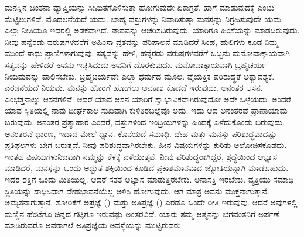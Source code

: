 ಮನಸ್ಸಿನ ಚಿಂತನಾ ವ್ಯಾಪ್ತಿಯನ್ನು ಸೀಮಿತಗೊಳಿಸುತ್ತಾ ಹೋಗುವುದೇ ಏಕಾಗ್ರತೆ. ಹಾಗೆ ಮಾಡುವುದಕ್ಕೆ ಎಂಟು ಮೆಟ್ಟಿಲುಗಳಿವೆ. ಮೊದಲನೆಯದೆ ಯಮ. ಬಾಹ್ಯ ವಸ್ತುಗಳನ್ನು ನಿವಾರಿಸುತ್ತಾ ಮನಸ್ಸನ್ನು ನಿಗ್ರಹಿಸುವುದೇ ಯಮ. ಎಲ್ಲಾ ನೀತಿಯೂ ಇದರಲ್ಲಿ ಅಡಕವಾಗಿದೆ. ಪಾಪವನ್ನು ಆಚರಿಸದಿರುವುದು. ಯಾರಿಗೂ ಹಿಂಸೆಯನ್ನು ಮಾಡದಿರುವುದು. ನೀವು ಹನ್ನೆರಡು ವರುಷಗಳವರೆಗೆ ಅಹಿಂಸಾ ವ್ರತವನ್ನು ಪರಿಪಾಲನೆ ಮಾಡಿದರೆ ಸಿಂಹ, ಹುಲಿಗಳು ಕೂಡ ನಿಮ್ಮ ಮುಂದೆ ಸಾಧು ಪ್ರಾಣಿಗಳಾಗುವುವು. ಸತ್ಯವನ್ನು ಹೇಳಿ, ಹನ್ನೆರಡು ವರುಷಗಳವರೆಗೆ ಒಬ್ಬನು ಮನೋವಾಕ್ಕಾಯವಾಗಿ ಸತ್ಯವನ್ನು ಹೇಳಿದರೆ ಅವನು ಇಚ್ಛಿಸಿದುದು ಅವನಿಗೆ ದೊರಕುವುದು. ಮನೋವಾಕ್ಕಾಯವಾಗಿ ಬ್ರಹ್ಮಚರ್ಯ ನಿಯಮವನ್ನು ಪಾಲಿಸಬೇಕು. ಬ್ರಹ್ಮಚರ್ಯವೇ ಎಲ್ಲಾ ಧರ್ಮದ ಮೂಲ. ವೈಯಕ್ತಿಕ ಪರಿಶುದ್ಧತೆ ಅತ್ಯಾವಶ್ಯಕ. ಎರಡನೆಯದೆ ನಿಯಮ. ಮನಸ್ಸು ಹೊರಗೆ ಹೋಗಲು ಅವಕಾಶ ಕೊಡದೆ ಇರುವುದು. ಅನಂತರ ಆಸನ. ಎಂಭತ್ತನಾಲ್ಕು ಆಸನಗಳಿವೆ. ಆದರೆ ಯಾವ ಆಸನ ಯಾರಿಗೆ ಸ್ವಾಭಾವಿಕವಾಗಿರುವುದೋ ಅದೇ ಒಳ್ಳೆಯದು. ಅಂದರೆ ಯಾವ ಸ್ಥಿತಿಯಲ್ಲಿ ನಾವು ದೀರ್ಘಕಾಲ ಸುಖವಾಗಿ ಕುಳಿತಿರಬಲ್ಲೆವೊ ಅದು. ಇದು ಆದ ಅನಂತರವೆ ಪ್ರಾಣಾಯಾಮ ಬರುವುದು. ಅನಂತರ ಪ್ರತ್ಯಾಹಾರ ಎಂದರೆ, ವಸ್ತುಗಳಿಂದ ಇಂದ್ರಿಯಗಳನ್ನು ಹಿಂದಕ್ಕೆ ಎಳೆದುಕೊಂಡು ಬರುವುದು. ಅನಂತರವೆ ಧಾರಣ, ಇದಾದ ಮೇಲೆ ಧ್ಯಾನ. ಕೊನೆಯದೆ ಸಮಾಧಿ. ದೇಹ ಮತ್ತು ಮನಸ್ಸು ಪರಿಶುದ್ಧವಾದಷ್ಟು ಪ್ರತಿಫಲಗಳು ಬೇಗ ಬರುತ್ತವೆ. ನೀವು ಪರಿಶುದ್ಧವಾಗಿರಬೇಕು. ಹೀನ ವಿಷಯಗಳನ್ನು ಕುರಿತು ಆಲೋಚಿಸಕೂಡದು. ಇಂತಹ ವಿಷಯಗಳು\break ನಿಜವಾಗಿ ನಮ್ಮನ್ನು ಕೆಳಕ್ಕೆ ಎಳೆಯುತ್ತವೆ. ನೀವು ಪರಿಶುದ್ಧರಾಗಿದ್ದರೆ, ಶ್ರದ್ಧೆಯಿಂದ ಅಭ್ಯಾಸ ಮಾಡಿದರೆ, ಮನಸ್ಸನ್ನು ಒಂದು ಅದ್ಭುತ ಶಕ್ತಿಯಿಂದ ಕೂಡಿದ ಪ್ರಕಾಶಮಾನವಾದ ಜ್ಯೋತಿಯನ್ನಾಗಿ ಮಾಡಬಹುದು. ಇದರ ಶಕ್ತಿಗೆ ಒಂದು ಮಿತಿಯಿಲ್ಲ. ಆದರೆ ಸತತ ಅಭ್ಯಾಸ ಮಾಡುತ್ತಿರಬೇಕು. ಅನಾಸಕ್ತಿ ಇರಬೇಕು. ವ್ಯಕ್ತಿಯು ಸಮಾಧಿ ಸ್ಥಿತಿಯನ್ನು ಸಾಧಿಸಿದಾಗ ದೇಹಭಾವನೆಯೆಲ್ಲ ಅಳಿಸಿ ಹೋಗುವುದು. ಆಗ ಮಾತ್ರ ಅವನು ಮುಕ್ತನಾಗುತ್ತಾನೆ. ಅಮೃತನಾಗುತ್ತಾನೆ. ತೋರಿಕೆಗೆ ಅಪ್ರಜ್ಞೆ () ಮತ್ತು ಅತಿಪ್ರಜ್ಞೆ () ಎರಡೂ ಒಂದೇ ರೀತಿ ಇರುವುವು. ಆದರೆ ಅವುಗಳಲ್ಲಿ ಮಣ್ಣಿನ ಹೆಂಟೆಗೂ ಚಿನ್ನದ ಗಟ್ಟಿಗೂ ಇರುವಷ್ಟು ಅಂತರವಿದೆ. ಯಾರು ತಮ್ಮ ಆತ್ಮನನ್ನು ಭಗವಂತನಿಗೆ ಅರ್ಪಣೆ ಮಾಡಿರುವರೊ ಅವರಾಗಲೆ ಅತಿಪ್ರಜ್ಞೆಯ ಅವಸ್ಥೆಯನ್ನು ಮುಟ್ಟಿರುವರು.

